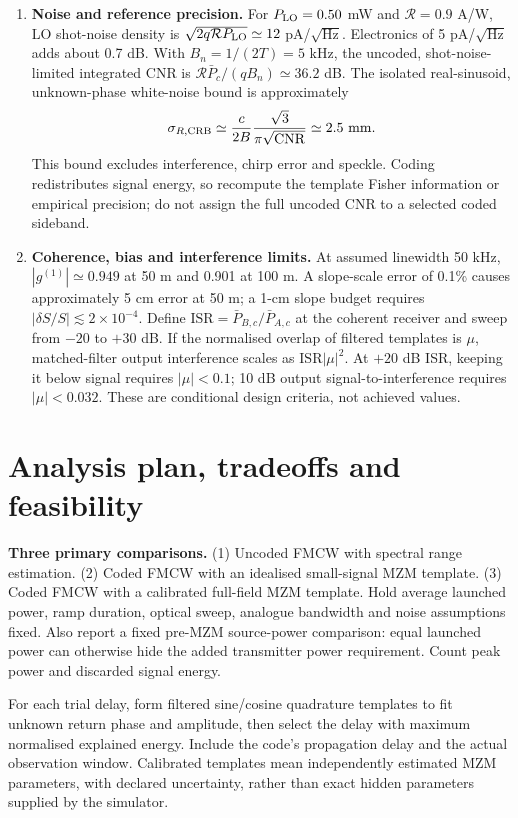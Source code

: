 \documentclass[10pt,letterpaper]{article}
\begin{document}
\begin{enumerate}
\item \textbf{Noise and reference precision.} For $P_{\rm LO}=0.50$ mW and $\mathcal R=0.9$ A/W, LO shot-noise density is $\sqrt{2q\mathcal RP_{\rm LO}}\simeq12$ pA/$\sqrt{\mathrm{Hz}}$. Electronics of 5 pA/$\sqrt{\mathrm{Hz}}$ adds about 0.7 dB. With $B_n=1/(2T)=5$ kHz, the uncoded, shot-noise-limited integrated CNR is $\mathcal R\bar P_c/(qB_n)\simeq36.2$ dB. The isolated real-sinusoid, unknown-phase white-noise bound \cite{kay} is approximately
\begin{equation}
\sigma_{R,\rm CRB}\simeq\frac{c}{2B}\frac{\sqrt3}{\pi\sqrt{\mathrm{CNR}}}\simeq2.5\ \mathrm{mm}.
\end{equation}
This bound excludes interference, chirp error and speckle. Coding redistributes signal energy, so recompute the template Fisher information or empirical precision; do not assign the full uncoded CNR to a selected coded sideband.
\item \textbf{Coherence, bias and interference limits.} At assumed linewidth 50 kHz, $|g^{(1)}|\simeq0.949$ at 50 m and 0.901 at 100 m. A slope-scale error of 0.1\% causes approximately 5 cm error at 50 m; a 1-cm slope budget requires $|\delta S/S|\lesssim2\times10^{-4}$. Define $\mathrm{ISR}=\bar P_{B,c}/\bar P_{A,c}$ at the coherent receiver and sweep from $-20$ to $+30$ dB. If the normalised overlap of filtered templates is $\mu$, matched-filter output interference scales as $\mathrm{ISR}|\mu|^2$. At $+20$ dB ISR, keeping it below signal requires $|\mu|<0.1$; 10 dB output signal-to-interference requires $|\mu|<0.032$. These are conditional design criteria, not achieved values.
\end{enumerate}
\newpage
\section{Analysis plan, tradeoffs and feasibility}
\textbf{Three primary comparisons.} (1) Uncoded FMCW with spectral range estimation. (2) Coded FMCW with an idealised small-signal MZM template. (3) Coded FMCW with a calibrated full-field MZM template. Hold average launched power, ramp duration, optical sweep, analogue bandwidth and noise assumptions fixed. Also report a fixed pre-MZM source-power comparison: equal launched power can otherwise hide the added transmitter power requirement. Count peak power and discarded signal energy.

For each trial delay, form filtered sine/cosine quadrature templates to fit unknown return phase and amplitude, then select the delay with maximum normalised explained energy. Include the code's propagation delay and the actual observation window. Calibrated templates mean independently estimated MZM parameters, with declared uncertainty, rather than exact hidden parameters supplied by the simulator.
\end{document}
